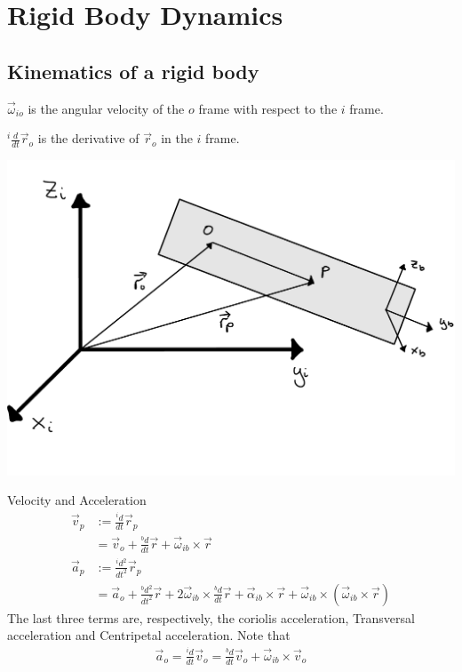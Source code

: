 \setcounter{section}{2}
\section{Rigid Body Dynamics}
\setcounter{section}{6}
\setcounter{subsection}{11}
\subsection{Kinematics of a rigid body} %
\(\vec{\omega}_{io}\) is the angular velocity of the \(o\) frame with respect to the \(i\) frame.

\({}^i\frac{d}{dt}\vec{r}_o\) is the derivative of \(\vec{r}_o\) in the \(i\) frame.

\begin{Figure}
    \includegraphics[width=\linewidth]{rigid-body.pdf}
    \label{fig:Test}
\end{Figure}

Velocity and Acceleration
\begin{align*}
    \vec{v}_p &:= \frac{{}^id}{dt}\vec{r}_p \\
              &= \vec{v}_o + \frac{{}^bd}{dt}\vec{r} + \vec{\omega}_{ib}\times\vec{r} \\
    \vec{a}_p &:= \frac{{}^id^2}{dt^2}\vec{r}_p \\
              &= \vec{a}_o + \frac{{}^bd^2}{dt^2}\vec{r} + 2\vec{\omega}_{ib}\times\frac{{}^bd}{dt}\vec{r} + \vec{\alpha}_{ib}\times\vec{r} + \vec{\omega}_{ib}\times(\vec{\omega}_{ib}\times\vec{r})
\end{align*}
The last three terms are, respectively, the coriolis acceleration, Transversal acceleration and Centripetal acceleration. Note that
\begin{align*}
    \vec{a}_o = \frac{{}^id}{dt}\vec{v}_o = \frac{{}^bd}{dt}\vec{v}_o + \vec{\omega}_{ib}\times\vec{v}_o
\end{align*}



